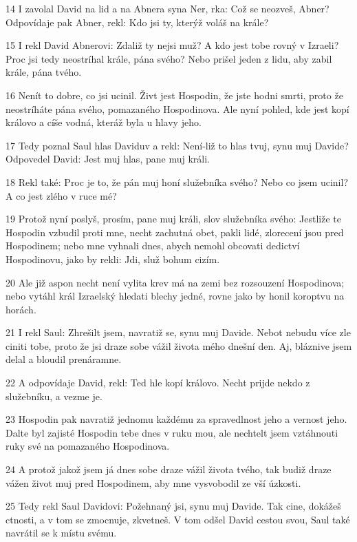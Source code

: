 \par 14 I zavolal David na lid a na Abnera syna Ner, rka: Což se neozveš, Abner? Odpovídaje pak Abner, rekl: Kdo jsi ty, kterýž voláš na krále?
\par 15 I rekl David Abnerovi: Zdaliž ty nejsi muž? A kdo jest tobe rovný v Izraeli? Proc jsi tedy neostríhal krále, pána svého? Nebo prišel jeden z lidu, aby zabil krále, pána tvého.
\par 16 Nenít to dobre, co jsi ucinil. Živt jest Hospodin, že jste hodni smrti, proto že neostríháte pána svého, pomazaného Hospodinova. Ale nyní pohled, kde jest kopí královo a cíše vodná, kteráž byla u hlavy jeho.
\par 17 Tedy poznal Saul hlas Daviduv a rekl: Není-liž to hlas tvuj, synu muj Davide? Odpovedel David: Jest muj hlas, pane muj králi.
\par 18 Rekl také: Proc je to, že pán muj honí služebníka svého? Nebo co jsem ucinil? A co jest zlého v ruce mé?
\par 19 Protož nyní poslyš, prosím, pane muj králi, slov služebníka svého: Jestliže te Hospodin vzbudil proti mne, necht zachutná obet, pakli lidé, zlorecení jsou pred Hospodinem; nebo mne vyhnali dnes, abych nemohl obcovati dedictví Hospodinovu, jako by rekli: Jdi, služ bohum cizím.
\par 20 Ale již aspon necht není vylita krev má na zemi bez rozsouzení Hospodinova; nebo vytáhl král Izraelský hledati blechy jedné, rovne jako by honil koroptvu na horách.
\par 21 I rekl Saul: Zhrešilt jsem, navratiž se, synu muj Davide. Nebot nebudu více zle ciniti tobe, proto že jsi draze sobe vážil života mého dnešní den. Aj, bláznive jsem delal a bloudil prenáramne.
\par 22 A odpovídaje David, rekl: Ted hle kopí královo. Necht prijde nekdo z služebníku, a vezme je.
\par 23 Hospodin pak navratiž jednomu každému za spravedlnost jeho a vernost jeho. Dalte byl zajisté Hospodin tebe dnes v ruku mou, ale nechtelt jsem vztáhnouti ruky své na pomazaného Hospodinova.
\par 24 A protož jakož jsem já dnes sobe draze vážil života tvého, tak budiž draze vážen život muj pred Hospodinem, aby mne vysvobodil ze vší úzkosti.
\par 25 Tedy rekl Saul Davidovi: Požehnaný jsi, synu muj Davide. Tak cine, dokážeš ctnosti, a v tom se zmocnuje, zkvetneš. V tom odšel David cestou svou, Saul také navrátil se k místu svému.

